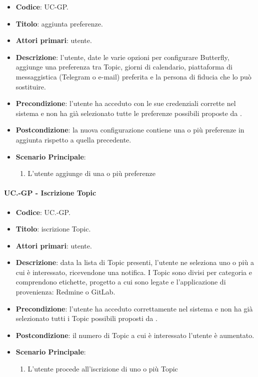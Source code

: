 	\begin{itemize}
		\item \textbf{Codice}: UC\theuccount-GP.
		\item \textbf{Titolo}: aggiunta preferenze.
		\item \textbf{Attori primari}: utente.
		\item \textbf{Descrizione}: l’utente, date le varie opzioni per configurare Butterfly, aggiunge una
		preferenza tra Topic, giorni di calendario, piattaforma di messaggistica (Telegram o e-mail)	preferita e la persona di fiducia che lo può sostituire.
		\item \textbf{Precondizione}: l’utente ha acceduto con le sue credenziali corrette nel sistema e non ha già selezionato tutte le preferenze possibili proposte da \progetto.
		\item \textbf{Postcondizione}: la nuova configurazione contiene una o più preferenze in aggiunta rispetto a quella precedente.
		\item \textbf{Scenario Principale}:
		\begin{enumerate}
			\item L'utente aggiunge di una o più preferenze
		\end{enumerate}
	\end{itemize}

	\paragraph{UC\theuccount.\thesubuccount-GP - Iscrizione Topic}
		
		\begin{itemize}
			\item \textbf{Codice}: UC\theuccount.\thesubuccount-GP.
			\item \textbf{Titolo}: iscrizione Topic.
			\item \textbf{Attori primari}: utente.
			\item \textbf{Descrizione}: data la lista di Topic presenti, l’utente ne seleziona uno o	più a cui è interessato, ricevendone una notifica. I Topic sono divisi per categoria e	comprendono etichette, progetto a cui sono legate e l'applicazione di provenienza: Redmine o GitLab.
			\item \textbf{Precondizione}: l’utente ha acceduto correttamente nel sistema e non ha già selezionato tutti i Topic possibili proposti da \progetto.
			\item \textbf{Postcondizione}: il numero di Topic a cui è interessato l’utente è aumentato.
			\item \textbf{Scenario Principale}:
			\begin{enumerate}
				\item L'utente procede all'iscrizione di uno o più Topic
			\end{enumerate}
		\end{itemize}
	
